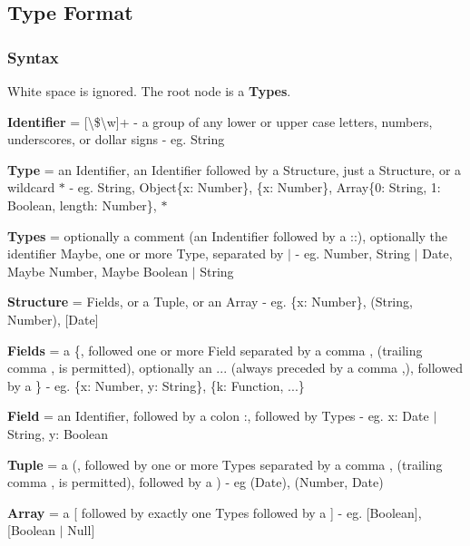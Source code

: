 \label{_type-format}%
 \subsection*{Type Format}

\subsubsection*{Syntax}

White space is ignored. The root node is a {\bfseries Types}.


\begin{DoxyItemize}
\item {\bfseries Identifier} = {\ttfamily \mbox{[}\textbackslash{}\$\textbackslash{}w\mbox{]}+} -\/ a group of any lower or upper case letters, numbers, underscores, or dollar signs -\/ eg. {\ttfamily String}
\item {\bfseries Type} = an {\ttfamily Identifier}, an {\ttfamily Identifier} followed by a {\ttfamily Structure}, just a {\ttfamily Structure}, or a wildcard {\ttfamily $\ast$} -\/ eg. {\ttfamily String}, {\ttfamily Object\{x\+: Number\}}, {\ttfamily \{x\+: Number\}}, {\ttfamily Array\{0\+: String, 1\+: Boolean, length\+: Number\}}, {\ttfamily $\ast$}
\item {\bfseries Types} = optionally a comment (an {\ttfamily Indentifier} followed by a {\ttfamily \+:\+:}), optionally the identifier {\ttfamily Maybe}, one or more {\ttfamily Type}, separated by {\ttfamily $\vert$} -\/ eg. {\ttfamily Number}, {\ttfamily String $\vert$ Date}, {\ttfamily Maybe Number}, {\ttfamily Maybe Boolean $\vert$ String}
\item {\bfseries Structure} = {\ttfamily Fields}, or a {\ttfamily Tuple}, or an {\ttfamily Array} -\/ eg. {\ttfamily \{x\+: Number\}}, {\ttfamily (String, Number)}, {\ttfamily \mbox{[}Date\mbox{]}}
\item {\bfseries Fields} = a {\ttfamily \{}, followed one or more {\ttfamily Field} separated by a comma {\ttfamily ,} (trailing comma {\ttfamily ,} is permitted), optionally an {\ttfamily ...} (always preceded by a comma {\ttfamily ,}), followed by a {\ttfamily \}} -\/ eg. {\ttfamily \{x\+: Number, y\+: String\}}, {\ttfamily \{k\+: Function, ...\}}
\item {\bfseries Field} = an {\ttfamily Identifier}, followed by a colon {\ttfamily \+:}, followed by {\ttfamily Types} -\/ eg. {\ttfamily x\+: Date $\vert$ String}, {\ttfamily y\+: Boolean}
\item {\bfseries Tuple} = a {\ttfamily (}, followed by one or more {\ttfamily Types} separated by a comma {\ttfamily ,} (trailing comma {\ttfamily ,} is permitted), followed by a {\ttfamily )} -\/ eg {\ttfamily (Date)}, {\ttfamily (Number, Date)}
\item {\bfseries Array} = a {\ttfamily \mbox{[}} followed by exactly one {\ttfamily Types} followed by a {\ttfamily \mbox{]}} -\/ eg. {\ttfamily \mbox{[}Boolean\mbox{]}}, {\ttfamily \mbox{[}Boolean $\vert$ Null\mbox{]}}
\end{DoxyItemize}

